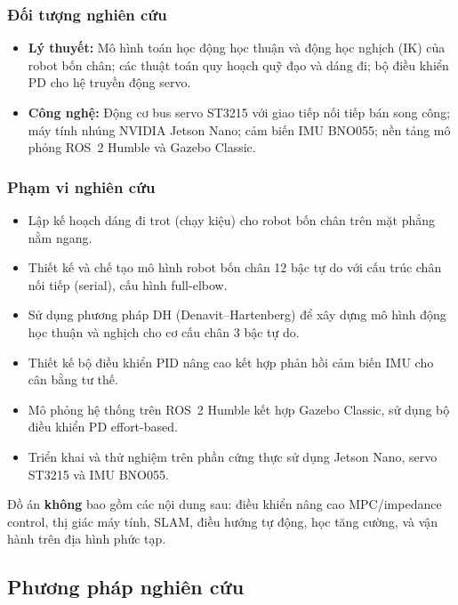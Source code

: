 \subsubsection{Đối tượng nghiên cứu}

\begin{itemize}
    \item \textbf{Lý thuyết:} Mô hình toán học động học thuận và động học nghịch (IK) của robot bốn chân; các thuật toán quy hoạch quỹ đạo và dáng đi; bộ điều khiển PD cho hệ truyền động servo.
    \item \textbf{Công nghệ:} Động cơ bus servo ST3215 với giao tiếp nối tiếp bán song công; máy tính nhúng NVIDIA Jetson Nano; cảm biến IMU BNO055; nền tảng mô phỏng ROS~2 Humble và Gazebo Classic.
\end{itemize}

\subsubsection{Phạm vi nghiên cứu}

\begin{itemize}
    \item Lập kế hoạch dáng đi trot (chạy kiệu) cho robot bốn chân trên mặt phẳng nằm ngang.
    \item Thiết kế và chế tạo mô hình robot bốn chân 12 bậc tự do với cấu trúc chân nối tiếp (serial), cấu hình full-elbow.
    \item Sử dụng phương pháp DH (Denavit--Hartenberg) để xây dựng mô hình động học thuận và nghịch cho cơ cấu chân 3 bậc tự do.
    \item Thiết kế bộ điều khiển PID nâng cao kết hợp phản hồi cảm biến IMU cho cân bằng tư thế.
    \item Mô phỏng hệ thống trên ROS~2 Humble kết hợp Gazebo Classic, sử dụng bộ điều khiển PD effort-based.
    \item Triển khai và thử nghiệm trên phần cứng thực sử dụng Jetson Nano, servo ST3215 và IMU BNO055.
\end{itemize}

Đồ án \textbf{không} bao gồm các nội dung sau: điều khiển nâng cao MPC/impedance control, thị giác máy tính, SLAM, điều hướng tự động, học tăng cường, và vận hành trên địa hình phức tạp.

\subsection{Phương pháp nghiên cứu}

